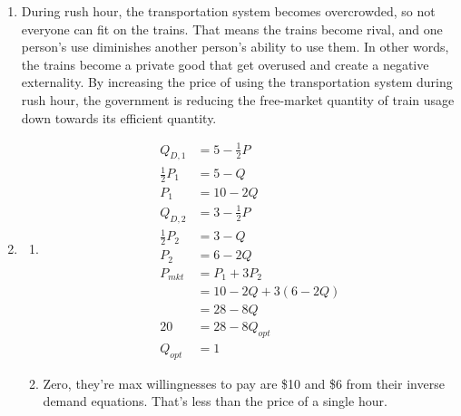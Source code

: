 \documentclass{article}
\begin{document}
\begin{enumerate}
\begin{enumerate}
	\item It's difficult to decide whether or not to supply them. 
	
	\end{enumerate}
	
\item During rush hour, the transportation system becomes overcrowded, so not everyone can fit on the trains. That means the trains become rival, and one person's use diminishes another person's ability to use them. In other words, the trains become a private good that get overused and create a negative externality. By increasing the price of using the transportation system during rush hour, the government is reducing the free-market quantity of train usage down towards its efficient quantity.

\item

	\begin{enumerate}
	
	\item \begin{align*}
		Q_{D,1} &= 5 - \frac{1}{2}P \\
		\frac{1}{2}P_1 &= 5 - Q \\
		P_1 &= 10 - 2Q \\
		Q_{D,2} &= 3 - \frac{1}{2}P \\
		\frac{1}{2}P_2 &= 3 - Q \\
		P_2 &= 6 - 2Q \\
		P_{mkt} &= P_1 + 3P_2 \\
		&= 10 - 2Q + 3(6 - 2Q) \\
		&= 28 - 8Q \\
		20 &= 28 - 8Q_{opt} \\
		Q_{opt} &= 1
		\end{align*}
	
	\item Zero, they're max willingnesses to pay are \$10 and \$6 from their inverse demand equations. That's less than the price of a single hour.
	
	\end{enumerate}

\end{enumerate}
\end{document}

